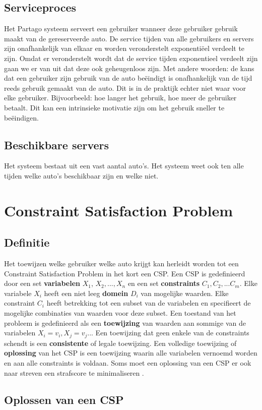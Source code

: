 \subsection{Serviceproces}
Het Partago systeem serveert een gebruiker wanneer deze gebruiker gebruik maakt van de gereserveerde auto. De service tijden van alle gebruikers en servers zijn onafhankelijk van elkaar en worden veronderstelt exponentiëel verdeelt te zijn. Omdat er veronderstelt wordt dat de service tijden exponentieel verdeelt zijn gaan we er van uit dat deze ook geheugenloos zijn. Met andere woorden: de kans dat een gebruiker zijn gebruik van de auto beëindigt is onafhankelijk van de tijd reeds gebruik gemaakt van de auto. Dit is in de praktijk echter niet waar voor elke gebruiker. Bijvoorbeeld: hoe langer het gebruik, hoe meer de gebruiker betaalt. Dit kan een intrinsieke motivatie zijn om het gebruik sneller te beëindigen.

\subsection{Beschikbare servers}
Het systeem bestaat uit een vast aantal auto's. Het systeem weet ook ten alle tijden welke auto's beschikbaar zijn en welke niet.


\section{Constraint Satisfaction Problem}

\subsection{Definitie}
Het toewijzen welke gebruiker welke auto krijgt kan herleidt worden tot een Constraint Satisfaction Problem in het kort een CSP. Een CSP is gedefinieerd door een set \textbf{variabelen} $X_{1}$, $X_{2},...,X_{n}$ en een set \textbf{constraints} $C_{1}, C_{2},...C_{m}$. Elke variabele $X_{i}$ heeft een niet leeg \textbf{domein} $D_{i}$ van mogelijke waarden. Elke constraint $C_{i}$ heeft betrekking tot een subset van de variabelen en specifieert de mogelijke combinaties van waarden voor deze subset. Een toestand van het probleem is gedefinieerd als een \textbf{toewijzing} van waarden aan sommige van de variabelen $X_{i} =  v_{i}, X_{j} = v_{j}$... Een toewijzing dat geen enkele van de constraints schendt is een \textbf{consistente} of legale toewijzing. Een volledige toewijzing of \textbf{oplossing} van het CSP is een toewijzing waarin alle variabelen vernoemd worden en aan alle constraints is voldaan. Soms moet een oplossing van een CSP er ook naar streven een strafscore te minimaliseren \autocite{norvig}.

\subsection{Oplossen van een CSP}